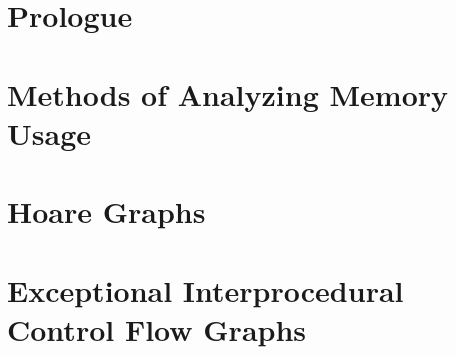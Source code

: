 \documentclass[pageskip]{VTthesis}
\begin{document}
  \frontmatter %
  \maketitle

  \tableofcontents
  \listofalgorithms
  \listoffigures
  \lstlistoflistings
  \listoftables
  \listoftheorems

  \printacronyms[heading=chapter]
  \printunsrtabbreviations[style=altlist] %
  \printunsrtglossary[type=symbols]


  \mainmatter %
  \acresetall %

  \part{Prologue}
  
  

  \part{Methods of Analyzing Memory Usage}\label{memory-usage}
  
  
  

  \part{Hoare Graphs}\label{hg}
  
  
  
  

  \part{Exceptional Interprocedural Control Flow Graphs}\label{eicfg}
  
  
  
\end{document}
